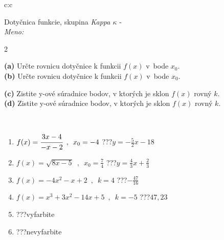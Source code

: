 \documentclass[10pt]{report}
\begin{document}
\begin{tabular}{c:c}
\begin{minipage}[c][104.5mm][t]{0.5\linewidth}
\begin{center}
\vspace{7mm}
{\huge Dotyčnica funkcie, skupina \textit{Kappa $\kappa$} -}\\[5mm]
\textit{Meno:}\phantom{xxxxxxxxxxxxxxxxxxxxxxxxxxxxxxxxxxxxxxxxxxxxxxxxxxxxxxxxxxxxxxxxx}\\[5mm]
\begin{minipage}{0.95\linewidth}
\begin{center}
{\small \begin{multicols}{2} \raggedright
\textbf{(a)} Určte rovnicu dotyčnice k funkcii \(f(x)\) v~bode \(x_0\). \\[1mm]
\textbf{(b)} Určte rovnicu dotyčnice k funkcii \(f(x)\) v~bode \(x_0\). \par \columnbreak
\textbf{(c)} Zistite y-ové súradnice bodov, v ktorých je sklon \(f(x)\) rovný \(k\). \\[1mm]
\textbf{(d)} Zistite y-ové súradnice bodov, v ktorých je sklon \(f(x)\) rovný \(k\). \\[1mm]
\end{multicols}
}
\end{center}
\end{minipage}
\\[4mm]
\begin{minipage}{0.79\linewidth}
\begin{center}
\begin{varwidth}{\linewidth}
\begin{enumerate}
\normalsizerr
\item $f(x)=\cfrac{3x-4}{-x-2}\enspace , \enspace x_0=-4$\quad \dotfill\; ???\;\dotfill \quad $y = -\frac{5}{2}x-18$
\item $f(x)=\sqrt{8x-5}\enspace , \enspace x_0=\frac{7}{4}$\quad \dotfill\; ???\;\dotfill \quad $y = \frac{4}{3}x+\frac{2}{3}$
\item $f(x)=-4x^2-x+2\enspace , \enspace k=4$\quad \dotfill\; ???\;\dotfill \quad $-\frac{47}{16}$
\item $f(x)=x^3+3x^2-14x+5\enspace , \enspace k=-5$\quad \dotfill\; ???\;\dotfill \quad $47 , 23$
\item \quad \dotfill\; ???\;\dotfill \quad vyfarbite
\item \quad \dotfill\; ???\;\dotfill \quad nevyfarbite
\end{enumerate}
\end{varwidth}

\end{center}
\end{minipage}
\end{center}
\end{minipage}
\end{tabular}
\end{document}

